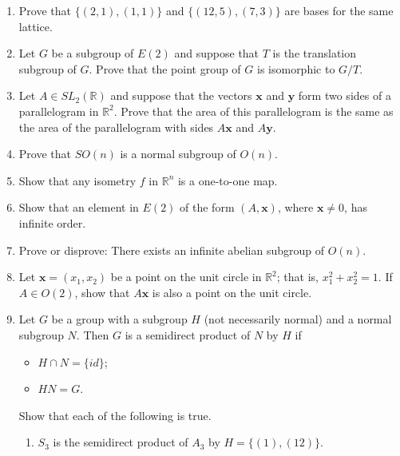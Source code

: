 {\begin{enumerate}
 
\item
Prove that $\{ (2,1), (1,1) \}$  and $\{ ( 12, 5), ( 7, 3) \}$ are bases
for the same lattice. 
 
 
\item
Let $G$ be a subgroup of $E(2)$ and suppose that $T$ is the
translation subgroup of $G$.  Prove that the point group of $G$ is
isomorphic to $G/T$. 
 
 
\item
Let $A \in SL_2({\mathbb R})$ and suppose that the vectors ${\mathbf x}$
and ${\mathbf y}$ form two sides of a parallelogram in ${\mathbb R}^2$.
Prove that the area of this parallelogram is the same as the area of
the parallelogram with sides $A{\mathbf x}$ and $A{\mathbf y}$. 
 
 
\item
Prove that $SO(n)$ is a normal subgroup of $O(n)$.
 
 
\item
Show that any isometry $f$ in ${\mathbb R}^n$ is a one-to-one map.
 
 
\item
Show that an element in $E(2)$ of the form $(A, {\mathbf x})$,
where ${\mathbf x} \neq 0$, has infinite order.
 
 
\item
Prove or disprove: There exists an infinite abelian subgroup of 
$O(n)$.
 
 
\item
Let ${\mathbf x} = (x_1, x_2)$ be a point on the unit circle in ${\mathbb
R}^2$; that is, $x_1^2 + x_2^2 = 1$. If $A \in O(2)$, show that $A
{\mathbf x}$ is also a point on the unit circle. 
 
 
 
\item
Let $G$ be a group with a subgroup $H$ (not necessarily normal) and a
normal subgroup $N$. Then $G$ is a {\bfi semidirect
product\/} of $N$ by $H$ if  
\begin{itemize}
 
 \item
$H \cap N = \{ id \}$;
 
 \item
$HN=G$.
 
\end{itemize}
Show that each of the following is true.
\begin{enumerate}
 
 \item
$S_3$ is the semidirect product of $A_3$ by $H = \{(1), (12) \}$.
 

\end{enumerate}
\end{enumerate}}
